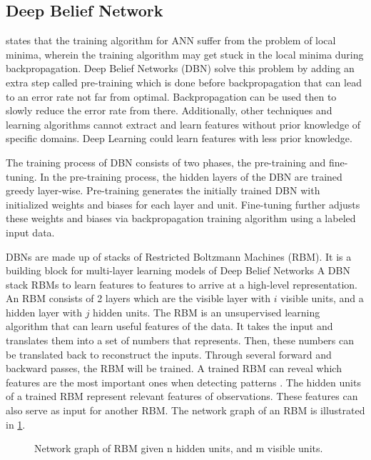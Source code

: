 \subsection{Deep Belief Network}
 states that the training algorithm for ANN suffer from the problem of local minima, wherein the training algorithm may get stuck in the local minima during backpropagation. Deep Belief Networks (DBN) solve this problem by adding an extra step called pre-training which is done before backpropagation that can lead to an error rate not far from optimal. Backpropagation can be used then to slowly reduce the error rate from there. Additionally, other techniques and learning algorithms cannot extract and learn features without prior knowledge of specific domains. Deep Learning could learn features with less prior knowledge. 

The training process of DBN consists of two phases, the pre-training and fine-tuning. In the pre-training process, the hidden layers of the DBN are trained greedy layer-wise. Pre-training generates the initially trained DBN with initialized weights and biases for each layer and unit. Fine-tuning further adjusts these weights and biases via backpropagation training algorithm using a labeled input data. 

DBNs are made up of stacks of Restricted Boltzmann Machines (RBM). It is a building block for multi-layer learning models of Deep Belief Networks A DBN stack RBMs to learn features to features to arrive at a high-level representation. An RBM consists of 2 layers which are the visible layer with $i$ visible units, and a hidden layer with $j$ hidden units. The RBM is an unsupervised learning algorithm that can learn useful features of the data. It takes the input and translates them into a set of numbers that represents. Then, these numbers can be translated back to reconstruct the inputs. Through several forward and backward passes, the RBM will be trained. A trained RBM can reveal which features are the most important ones when detecting patterns . The hidden units of a trained RBM represent relevant features of observations. These features can also serve as input for another RBM. The network graph of an RBM is illustrated in \ref{fig:rbmexample}.

\begin{figure}[h]
	\centering
	\captionsetup{justification=centering}
	\caption{Network graph of RBM given n hidden units, and m visible units.}
	\label{fig:rbmexample}
\end{figure}

